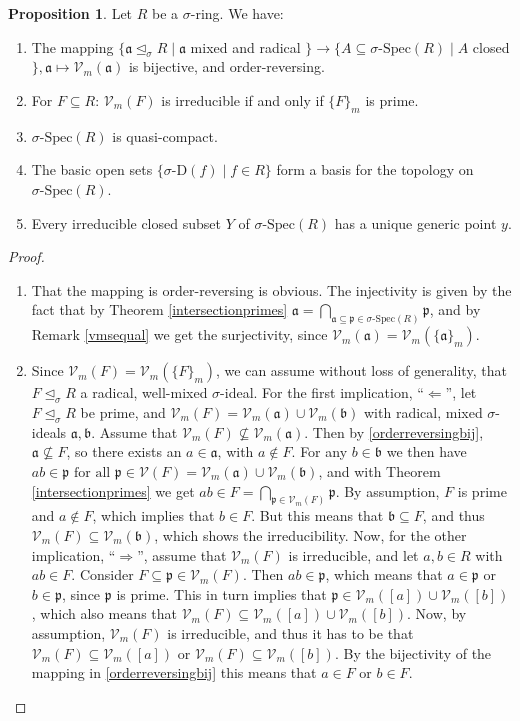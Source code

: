 \documentclass{article}
\def\Vm{\mathcal{V}_m}
\def\V{\mathcal{V}}
\def\a{\mathfrak{a}}
\def\b{\mathfrak{b}}
\def\p{\mathfrak{p}}
\def\s{\sigma}
\def\si{\unlhd_{\sigma}}
\def\sSpec{\sigma\text{-Spec}}
\def\fa{\text{ for all }}
\newenvironment{bew}{\begin{proof}[Proof]}{\end{proof}}
\theoremstyle{definition}
\newtheorem{prop}[Satz]{Proposition}
\begin{document}
\begin{prop}
Let $R$ be a $\s$-ring. We have:
\begin{enumerate}
\item \label{vmbijection} The mapping $\{ \a \si R \mid \a$ mixed and radical $\} \rightarrow \{ A \subseteq \sSpec(R) \mid A $ closed $\}, \a \mapsto \Vm(\a)$ is bijective, and order-reversing.
\item \label{irred=prime} For $F \subseteq R$:  $\Vm(F)$ is irreducible if and only if $\{F\}_m$ is prime.
\item $\sSpec(R)$ is quasi-compact.
\item The basic open sets $\{ \s$-D$(f) \mid f \in R \}$ form a basis for the topology on $\sSpec(R)$.
\item Every irreducible closed subset $Y$ of $\sSpec(R)$ has a unique generic point $y$.
\end{enumerate}
\begin{bew}
\begin{enumerate}
\item \label{orderreversingbij} That the mapping is order-reversing is obvious. The injectivity is given by the fact that by Theorem \ref{intersectionprimes} $\a = \bigcap_{\a \subseteq \p \in \sSpec(R)} \p$, and by Remark \ref{vmsequal} we get the surjectivity,
 since $\Vm(\a) = \Vm(\{\a\}_m)$.
\item Since $\Vm(F) = \Vm(\{F\}_m)$, we can assume without loss of generality, that $F \si R$ a radical, well-mixed $\s$-ideal.
For the first implication, ``$\Leftarrow$'', let $F \si R$ be prime, and $\Vm(F) = \Vm(\a) \cup \Vm(\b)$ with radical, mixed $\s$-ideals $\a, \b$. Assume that $\Vm(F) \not\subseteq \Vm(\a)$. Then by \ref{orderreversingbij}, $\a \not \subseteq F$, so there exists an $a \in \a$, with $a \notin F$.
For any $b \in \b$ we then have $ab \in \p \fa \p \in \V(F) = \Vm(\a) \cup \Vm(\b)$, and with Theorem \ref{intersectionprimes} we get $ab \in F = \bigcap_{\p \in \Vm(F)}\p$. By assumption, $F$ is prime and $a \notin F$, which implies
 that  $b \in F$. But this means that $\b \subseteq F$, and thus $\Vm(F) \subseteq \Vm(\b)$, which shows the irreducibility. 
Now, for the other implication, ``$\Rightarrow$'', assume that $\Vm(F)$ is irreducible, and let $a,b \in R$ with $ab \in F$. Consider $F \subseteq \p \in \Vm(F)$. Then $ab \in \p$, 
which means that $a \in \p$ or $b \in \p$, since $\p$ is prime. This in turn implies that $\p \in \Vm([a]) \cup \Vm([b])$, which also means that $\Vm(F) \subseteq \Vm([a]) \cup \Vm([b])$.
Now, by assumption, $\Vm(F)$ is irreducible, and thus it has to be that $\Vm(F) \subseteq \Vm([a])$ or $\Vm(F) \subseteq \Vm([b])$. By the bijectivity of the mapping in \ref{orderreversingbij} this means that $a \in F$ or $b \in F$.

\end{enumerate}
\end{bew}
\end{prop}
\end{document}
